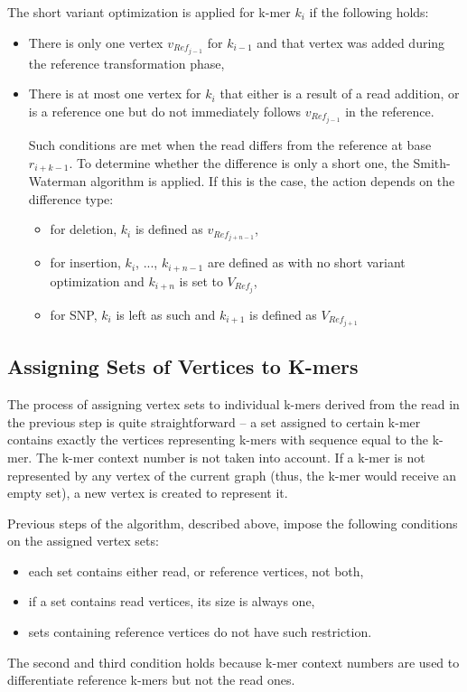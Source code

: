 The short variant optimization is applied for k-mer $k_i$ if the following holds:
\begin{itemize}
\item There is only one vertex $v_{Ref_{j-1}}$ for $k_{i-1}$ and that vertex was added during the reference transformation phase,
\item There is at most one vertex for $k_i$ that either is a result of a read addition, or is a reference one but do not immediately follows  $v_{Ref_{j-1}}$ in the reference.

Such conditions are met when the read differs from the reference at base $r_{i+k-1}$. To determine whether the difference is only a short one, the Smith-Waterman algorithm is applied. If this is the case, the action depends on the difference type:
\begin{itemize}
\item for deletion, $k_i$ is defined as $v_{Ref_{j + n - 1}}$,
\item for insertion, $k_i$, ..., $k_{i + n - 1}$ are defined as with no short variant optimization and $k_{i + n}$ is set to $V_{Ref_{j}}$,
\item for SNP, $k_i$ is left as such and $k_{i+1}$ is defined as $V_{Ref_{j+1}}$
\end{itemize}
\end{itemize}

\subsection{Assigning Sets of Vertices to K-mers}
\label{subsec:assign-sets}

The process of assigning vertex sets to individual k-mers derived from the read in the previous step is quite straightforward – a set assigned to certain k-mer contains exactly the vertices representing k-mers with sequence equal to the k-mer. The k-mer context number is not taken into account. If a k-mer is not represented by any vertex of the current graph (thus, the k-mer would receive an empty set), a new vertex is created to represent it.

Previous steps of the algorithm, described above, impose the following conditions on the assigned vertex sets:
\begin{itemize}
\item each set contains either read, or reference vertices, not both,
\item if a set contains read vertices, its size is always one,
\item sets containing reference vertices do not have such restriction.
\end{itemize}
The second and third condition holds because k-mer context numbers are used to differentiate reference k-mers but not the read ones. 

